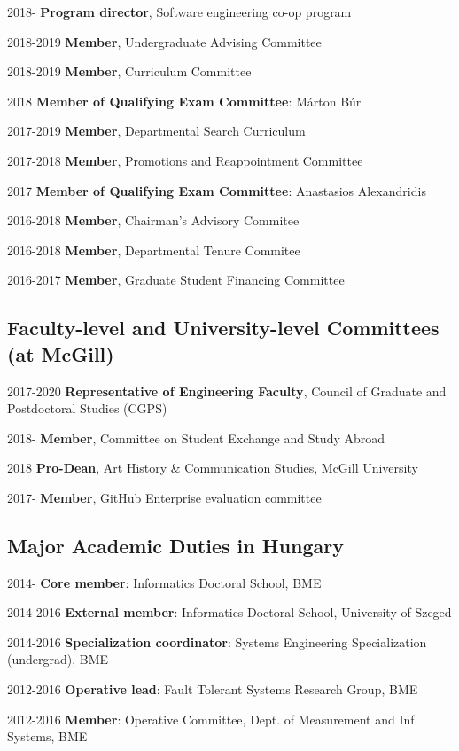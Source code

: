 \begin{yearlist}
\item[2018-] \textbf{Program director}, Software engineering co-op program 
\item[2018-2019] \textbf{Member}, Undergraduate Advising Committee
\item[2018-2019] \textbf{Member}, Curriculum Committee 
\item[2018] \textbf{Member of Qualifying Exam Committee}: M\'arton B\'ur
\item[2017-2019] \textbf{Member}, Departmental Search Curriculum 
\item[2017-2018] \textbf{Member}, Promotions and Reappointment Committee 
\item[2017] \textbf{Member of Qualifying Exam Committee}: Anastasios Alexandridis
\item[2016-2018] \textbf{Member}, Chairman's Advisory Commitee 
\item[2016-2018] \textbf{Member}, Departmental Tenure Commitee 
\item[2016-2017] \textbf{Member}, Graduate Student Financing Committee
\end{yearlist}

\subsection{Faculty-level and University-level Committees (at McGill)}
\begin{yearlist}
\item[2017-2020] \textbf{Representative of Engineering Faculty}, Council of Graduate and Postdoctoral Studies (CGPS) 
\item[2018-] \textbf{Member}, Committee on Student Exchange and Study Abroad 
\item[2018] \textbf{Pro-Dean}, Art History \& Communication Studies, McGill University 
\item[2017-] \textbf{Member}, GitHub Enterprise evaluation committee 
\end{yearlist}

\subsection{Major Academic Duties in Hungary}

\begin{yearlist}
\item[2014-] \textbf{Core member}: Informatics Doctoral School, BME   
\item[2014-2016] \textbf{External member}: Informatics Doctoral School, University of Szeged  
\item[2014-2016] \textbf{Specialization coordinator}:  Systems Engineering Specialization (undergrad), BME   
\item[2012-2016] \textbf{Operative lead}: Fault Tolerant Systems Research Group, BME   
\item[2012-2016] \textbf{Member}: Operative Committee, Dept. of Measurement and Inf. Systems, BME  
\end{yearlist}

